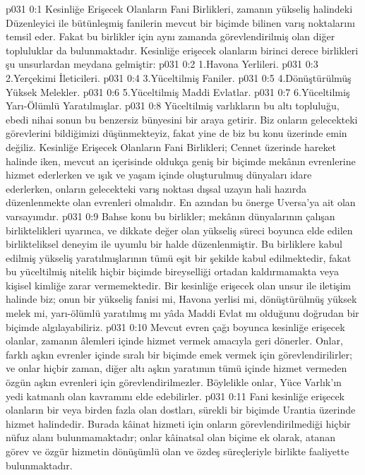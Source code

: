 \vs p031 0:1 Kesinliğe Erişecek Olanların Fani Birlikleri, zamanın yükseliş halindeki Düzenleyici ile bütünleşmiş fanilerin mevcut bir biçimde bilinen varış noktalarını temsil eder. Fakat bu birlikler için aynı zamanda görevlendirilmiş olan diğer topluluklar da bulunmaktadır. Kesinliğe erişecek olanların birinci derece birlikleri şu unsurlardan meydana gelmiştir:
\vs p031 0:2 1.\bibnobreakspace Havona Yerlileri.
\vs p031 0:3 2.\bibnobreakspace Yerçekimi İleticileri.
\vs p031 0:4 3.\bibnobreakspace Yüceltilmiş Faniler.
\vs p031 0:5 4.\bibnobreakspace Dönüştürülmüş Yüksek Melekler.
\vs p031 0:6 5.\bibnobreakspace Yüceltilmiş Maddi Evlatlar.
\vs p031 0:7 6.\bibnobreakspace Yüceltilmiş Yarı\hyp{}Ölümlü Yaratılmışlar.
\vs p031 0:8 Yüceltilmiş varlıkların bu altı topluluğu, ebedi nihai sonun bu benzersiz bünyesini bir araya getirir. Biz onların gelecekteki görevlerini bildiğimizi düşünmekteyiz, fakat yine de biz bu konu üzerinde emin değiliz. Kesinliğe Erişecek Olanların Fani Birlikleri; Cennet üzerinde hareket halinde iken, mevcut an içerisinde oldukça geniş bir biçimde mekânın evrenlerine hizmet ederlerken ve ışık ve yaşam içinde oluşturulmuş dünyaları idare ederlerken, onların gelecekteki varış noktası dışsal uzayın hali hazırda düzenlenmekte olan evrenleri olmalıdır. En azından bu önerge Uversa’ya ait olan varsayımdır.
\vs p031 0:9 Bahse konu bu birlikler; mekânın dünyalarının çalışan birliktelikleri uyarınca, ve dikkate değer olan yükseliş süreci boyunca elde edilen birlikteliksel deneyim ile uyumlu bir halde düzenlenmiştir. Bu birliklere kabul edilmiş yükseliş yaratılmışlarının tümü eşit bir şekilde kabul edilmektedir, fakat bu yüceltilmiş nitelik hiçbir biçimde bireyselliği ortadan kaldırmamakta veya kişisel kimliğe zarar vermemektedir. Bir kesinliğe erişecek olan unsur ile iletişim halinde biz; onun bir yükseliş fanisi mi, Havona yerlisi mi, dönüştürülmüş yüksek melek mi, yarı\hyp{}ölümlü yaratılmış mı yâda Maddi Evlat mı olduğunu doğrudan bir biçimde algılayabiliriz.
\vs p031 0:10 Mevcut evren çağı boyunca kesinliğe erişecek olanlar, zamanın âlemleri içinde hizmet vermek amacıyla geri dönerler. Onlar, farklı aşkın evrenler içinde sıralı bir biçimde emek vermek için görevlendirilirler; ve onlar hiçbir zaman, diğer altı aşkın yaratımın tümü içinde hizmet vermeden özgün aşkın evrenleri için görevlendirilmezler. Böylelikle onlar, Yüce Varlık’ın yedi katmanlı olan kavramını elde edebilirler.
\vs p031 0:11 Fani kesinliğe erişecek olanların bir veya birden fazla olan dostları, sürekli bir biçimde Urantia üzerinde hizmet halindedir. Burada kâinat hizmeti için onların görevlendirilmediği hiçbir nüfuz alanı bulunmamaktadır; onlar kâinatsal olan biçime ek olarak, atanan görev ve özgür hizmetin dönüşümlü olan ve özdeş süreçleriyle birlikte faaliyette bulunmaktadır.

